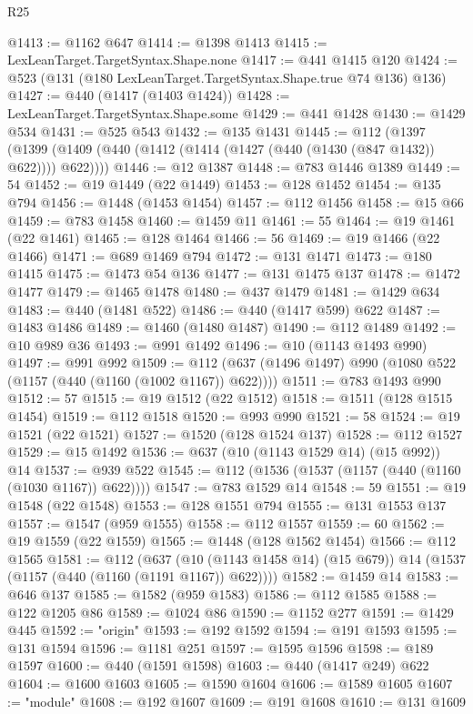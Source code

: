 \begin{lexlean}{R25}
\begin{coremodule}
{{{{{{{{{{{{{{{{{{{{{{{{{{{{{{{{{{{{{{{{{{{{{{{{{{{{{{{{{{{{{{{{{{{{{{{{{{{{{{{{{{{{{{{{{{{{{{{{{{{{{{{{{{{{{{{{{{{{{{{{{{{{{{{{{{{{{{{{{{{{{{{{{{{{{{{{{{{{{{{{{{{{{{{{{{{{{{{{{{{{{{{{{{{{{{{{{{{{{{{@1413 := @1162 @647
@1414 := @1398 @1413
@1415 := LexLeanTarget.TargetSyntax.Shape.none
@1417 := @441 @1415 @120
@1424 := @523 (@131 (@180 LexLeanTarget.TargetSyntax.Shape.true @74 @136) @136)
@1427 := @440 (@1417 (@1403 @1424))
@1428 := LexLeanTarget.TargetSyntax.Shape.some
@1429 := @441 @1428
@1430 := @1429 @534
@1431 := @525 @543
@1432 := @135 @1431
@1445 := @112
    (@1397 (@1399 (@1409 (@440 (@1412 (@1414 (@1427 (@440 (@1430 (@847 @1432)) @622)))) @622))))
@1446 := @12 @1387
@1448 := @783 @1446 @1389
@1449 := 54
@1452 := @19 @1449 (@22 @1449)
@1453 := @128 @1452
@1454 := @135 @794
@1456 := @1448 (@1453 @1454)
@1457 := @112 @1456
@1458 := @15 @66
@1459 := @783 @1458
@1460 := @1459 @11
@1461 := 55
@1464 := @19 @1461 (@22 @1461)
@1465 := @128 @1464
@1466 := 56
@1469 := @19 @1466 (@22 @1466)
@1471 := @689 @1469 @794
@1472 := @131 @1471
@1473 := @180 @1415
@1475 := @1473 @54 @136
@1477 := @131 @1475 @137
@1478 := @1472 @1477
@1479 := @1465 @1478
@1480 := @437 @1479
@1481 := @1429 @634
@1483 := @440 (@1481 @522)
@1486 := @440 (@1417 @599) @622
@1487 := @1483 @1486
@1489 := @1460 (@1480 @1487)
@1490 := @112 @1489
@1492 := @10 @989 @36
@1493 := @991 @1492
@1496 := @10 (@1143 @1493 @990)
@1497 := @991 @992
@1509 := @112 (@637 (@1496 @1497) @990 (@1080 @522 (@1157 (@440 (@1160 (@1002 @1167)) @622))))
@1511 := @783 @1493 @990
@1512 := 57
@1515 := @19 @1512 (@22 @1512)
@1518 := @1511 (@128 @1515 @1454)
@1519 := @112 @1518
@1520 := @993 @990
@1521 := 58
@1524 := @19 @1521 (@22 @1521)
@1527 := @1520 (@128 @1524 @137)
@1528 := @112 @1527
@1529 := @15 @1492
@1536 := @637 (@10 (@1143 @1529 @14) (@15 @992)) @14
@1537 := @939 @522
@1545 := @112 (@1536 (@1537 (@1157 (@440 (@1160 (@1030 @1167)) @622))))
@1547 := @783 @1529 @14
@1548 := 59
@1551 := @19 @1548 (@22 @1548)
@1553 := @128 @1551 @794
@1555 := @131 @1553 @137
@1557 := @1547 (@959 @1555)
@1558 := @112 @1557
@1559 := 60
@1562 := @19 @1559 (@22 @1559)
@1565 := @1448 (@128 @1562 @1454)
@1566 := @112 @1565
@1581 := @112
    (@637 (@10 (@1143 @1458 @14) (@15 @679)) @14 (@1537 (@1157 (@440 (@1160 (@1191 @1167)) @622))))
@1582 := @1459 @14
@1583 := @646 @137
@1585 := @1582 (@959 @1583)
@1586 := @112 @1585
@1588 := @122 @1205 @86
@1589 := @1024 @86
@1590 := @1152 @277
@1591 := @1429 @445
@1592 := "origin"
@1593 := @192 @1592
@1594 := @191 @1593
@1595 := @131 @1594
@1596 := @1181 @251
@1597 := @1595 @1596
@1598 := @189 @1597
@1600 := @440 (@1591 @1598)
@1603 := @440 (@1417 @249) @622
@1604 := @1600 @1603
@1605 := @1590 @1604
@1606 := @1589 @1605
@1607 := "module"
@1608 := @192 @1607
@1609 := @191 @1608
@1610 := @131 @1609
}}}}}}}}}}}}}}}}}}}}}}}}}}}}}}}}}}}}}}}}}}}}}}}}}}}}}}}}}}}}}}}}}}}}}}}}}}}}}}}}}}}}}}}}}}}}}}}}}}}}}}}}}}}}}}}}}}}}}}}}}}}}}}}}}}}}}}}}}}}}}}}}}}}}}}}}}}}}}}}}}}}}}}}}}}}}}}}}}}}}}}}}}}}}}}}}}}}}}}}
\end{coremodule}
\end{lexlean}
